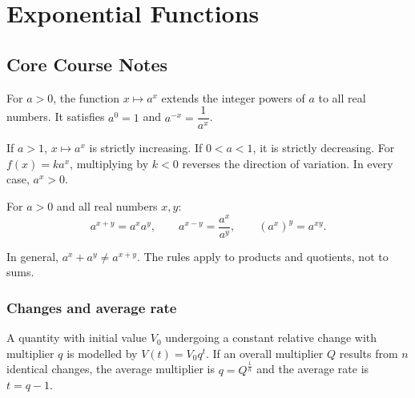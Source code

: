 
\chapter{Exponential Functions}
\section{Core Course Notes}
For $a>0$, the function $x\mapsto a^x$ extends the integer powers of $a$ to all real numbers. It satisfies $a^0=1$ and $a^{-x}=\dfrac{1}{a^x}$.

\begin{center}
\end{center}

\begin{retenir}
If $a>1$, $x\mapsto a^x$ is strictly increasing. If $0<a<1$, it is strictly decreasing. For $f(x)=ka^x$, multiplying by $k<0$ reverses the direction of variation. In every case, $a^x>0$.
\end{retenir}

For $a>0$ and all real numbers $x,y$:
\[
a^{x+y}=a^xa^y,\qquad a^{x-y}=\frac{a^x}{a^y},\qquad (a^x)^y=a^{xy}.
\]

\begin{erreur}
In general, $a^x+a^y\neq a^{x+y}$. The rules apply to products and quotients, not to sums.
\end{erreur}

\subsection{Changes and average rate}
A quantity with initial value $V_0$ undergoing a constant relative change with multiplier $q$ is modelled by $V(t)=V_0q^t$. If an overall multiplier $Q$ results from $n$ identical changes, the average multiplier is $q=Q^{\frac1n}$ and the average rate is $t=q-1$.


